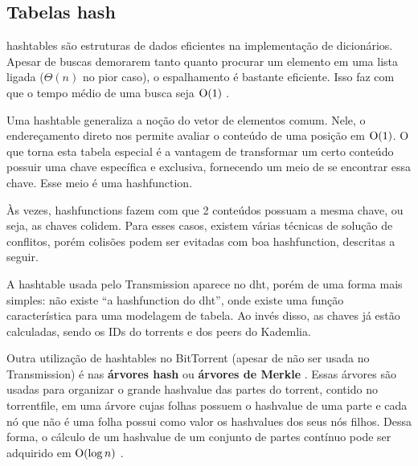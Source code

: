 
\subsection*{Tabelas hash}

\Glspl{hashtable} são estruturas de dados eficientes na implementação de dicionários.
Apesar de buscas demorarem tanto quanto procurar um elemento em uma lista ligada
($\Theta(n)$ no pior caso), o espalhamento é bastante eficiente. Isso faz com que o
tempo médio de uma busca seja $\textup{O}(1)$ \cite{book:clrs}.

Uma \gls*{hashtable} generaliza a noção do vetor de elementos comum. Nele, o
endereçamento direto nos permite avaliar o conteúdo de uma posição em $\textup{O}(1)$. O que
torna esta tabela especial é a vantagem de transformar um certo conteúdo possuir uma
chave específica e exclusiva, fornecendo um meio de se encontrar essa chave. Esse meio é
uma \gls{hashfunction}.

Às vezes, \glspl*{hashfunction} fazem com que 2 conteúdos possuam a mesma chave, ou
seja, as chaves colidem. Para esses casos, existem várias técnicas de solução de
conflitos, porém colisões podem ser evitadas com boa \gls*{hashfunction}, descritas a
seguir.

A \gls*{hashtable} usada pelo Transmission aparece no \gls*{dht}, porém de uma forma
mais simples: não existe ``a \gls*{hashfunction} do \gls*{dht}'', onde existe uma função
característica para uma modelagem de tabela. Ao invés disso, as chaves já estão
calculadas, sendo os IDs do \glspl*{torrent} e dos \glspl*{peer} do Kademlia.

Outra utilização de \gls*{hashtables} no BitTorrent (apesar de não ser usada no
Transmission) é nas \textbf{árvores hash} ou \textbf{árvores de Merkle}
\cite{site:merkletree}. Essas árvores são usadas para organizar o grande
\gls*{hashvalue} das partes do \gls*{torrent}, contido no \gls*{torrentfile}, em uma
árvore cujas folhas possuem o \gls*{hashvalue} de uma parte e cada nó que não é uma
folha possui como valor os \glspl*{hashvalue} dos seus nós filhos. Dessa forma, o
cálculo de um \gls*{hashvalue} de um conjunto de partes contínuo pode ser adquirido em
$\textup{O}(\log n)$ \cite{artigo:merkletree-cripto}.